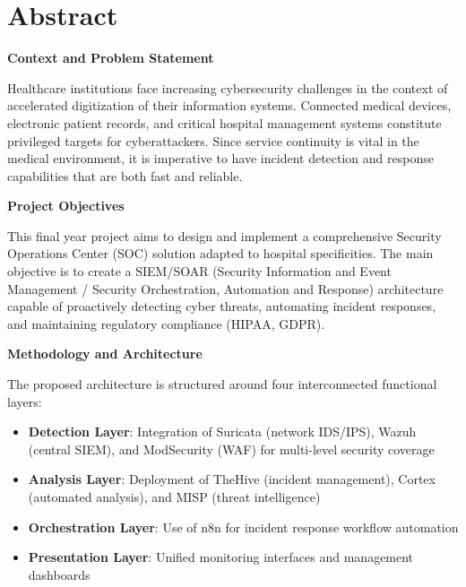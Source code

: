 \chapter*{Abstract}

\vspace{1cm}

\textbf{Context and Problem Statement}

Healthcare institutions face increasing cybersecurity challenges in the context of accelerated digitization of their information systems. Connected medical devices, electronic patient records, and critical hospital management systems constitute privileged targets for cyberattackers. Since service continuity is vital in the medical environment, it is imperative to have incident detection and response capabilities that are both fast and reliable.

\vspace{0.5cm}

\textbf{Project Objectives}

This final year project aims to design and implement a comprehensive Security Operations Center (SOC) solution adapted to hospital specificities. The main objective is to create a SIEM/SOAR (Security Information and Event Management / Security Orchestration, Automation and Response) architecture capable of proactively detecting cyber threats, automating incident responses, and maintaining regulatory compliance (HIPAA, GDPR).

\vspace{0.5cm}

\textbf{Methodology and Architecture}

The proposed architecture is structured around four interconnected functional layers:

\begin{itemize}
    \item \textbf{Detection Layer}: Integration of Suricata (network IDS/IPS), Wazuh (central SIEM), and ModSecurity (WAF) for multi-level security coverage
    \item \textbf{Analysis Layer}: Deployment of TheHive (incident management), Cortex (automated analysis), and MISP (threat intelligence)
    \item \textbf{Orchestration Layer}: Use of n8n for incident response workflow automation
    \item \textbf{Presentation Layer}: Unified monitoring interfaces and management dashboards
\end{itemize}

